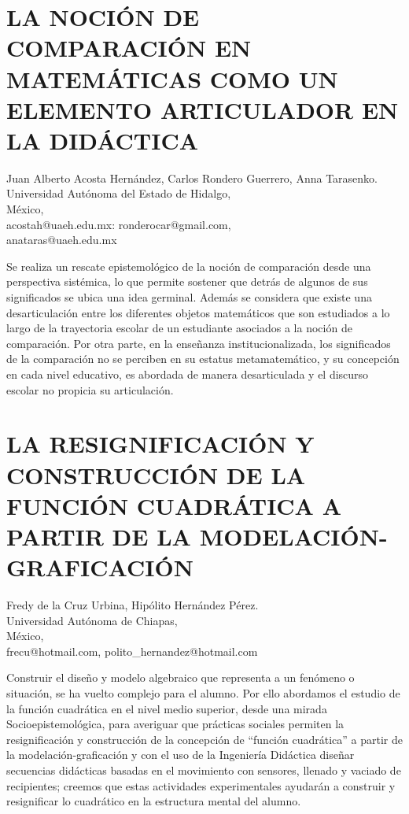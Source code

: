 \section{LA NOCIÓN DE COMPARACIÓN EN MATEMÁTICAS COMO UN ELEMENTO ARTICULADOR
EN LA DIDÁCTICA}

\begin{datos}
Juan Alberto Acosta Hernández, Carlos Rondero Guerrero, Anna Tarasenko. \\
 Universidad Autónoma del Estado de Hidalgo,  \\
\hfill México, \\
\hfill acostah@uaeh.edu.mx: ronderocar@gmail.com, \\
\hfill anataras@uaeh.edu.mx 
\end{datos}

Se realiza un rescate epistemológico de la noción de comparación desde
una perspectiva sistémica, lo que permite sostener que detrás de algunos
de sus significados se ubica una idea germinal. Además se considera
que existe una desarticulación entre los diferentes objetos matemáticos
que son estudiados a lo largo de la trayectoria escolar de un estudiante
asociados a la noción de comparación. Por otra parte, en la enseñanza
institucionalizada, los significados de la comparación no se perciben
en su estatus metamatemático, y su concepción en cada nivel educativo,
es abordada de manera desarticulada y el discurso escolar no propicia
su articulación. 


\section{LA RESIGNIFICACIÓN Y CONSTRUCCIÓN DE LA FUNCIÓN CUADRÁTICA A PARTIR
DE LA MODELACIÓN-GRAFICACIÓN }

\begin{datos}
Fredy de la Cruz Urbina, Hipólito Hernández Pérez. \\
 Universidad Autónoma de Chiapas, \\
\hfill México, \\
\hfill frecu@hotmail.com, polito\_{}hernandez@hotmail.com 
\end{datos}

Construir el diseño y modelo algebraico que representa a un fenómeno
o situación, se ha vuelto complejo para el alumno. Por ello abordamos
el estudio de la función cuadrática en el nivel medio superior, desde
una mirada Socioepistemológica, para averiguar que prácticas sociales
permiten la resignificación y construcción de la concepción de “función
cuadrática” a partir de la modelación-graficación y con el uso de
la Ingeniería Didáctica diseñar secuencias didácticas basadas en el
movimiento con sensores, llenado y vaciado de recipientes; creemos
que estas actividades experimentales ayudarán a construir y resignificar
lo cuadrático en la estructura mental del alumno. 


